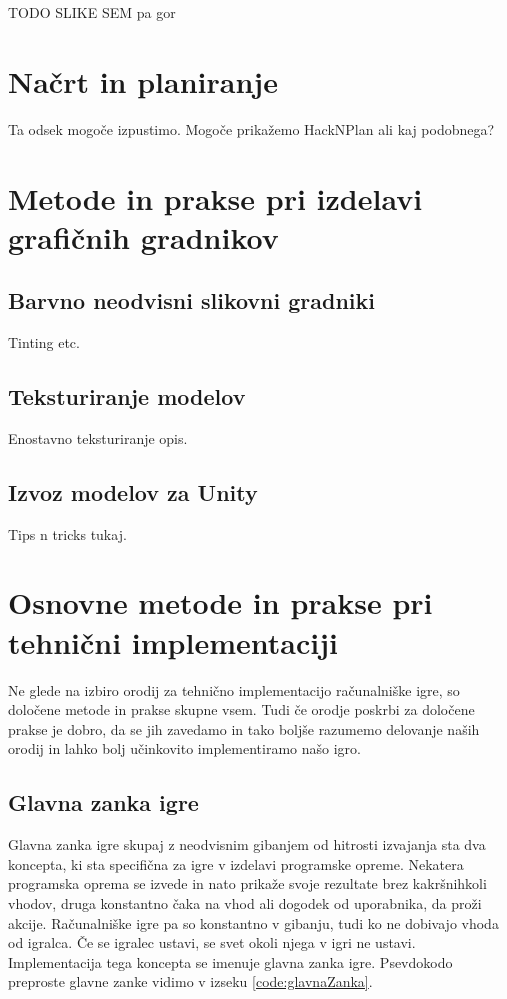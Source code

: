 \documentclass[12pt,a4paper,twoside]{book}
\begin{document}
TODO SLIKE SEM pa gor

\section{Načrt in planiranje}
Ta odsek mogoče izpustimo. Mogoče prikažemo HackNPlan ali kaj podobnega?
\section{Metode in prakse pri izdelavi grafičnih gradnikov}
\subsection{Barvno neodvisni slikovni gradniki}
Tinting etc.
\subsection{Teksturiranje modelov}
Enostavno teksturiranje opis.
\subsection{Izvoz modelov za Unity}
Tips n tricks tukaj.

\section{Osnovne metode in prakse pri tehnični implementaciji}
Ne glede na izbiro orodij za tehnično implementacijo računalniške igre, so določene metode in prakse skupne vsem. Tudi če orodje poskrbi za določene prakse je dobro, da se jih zavedamo in tako boljše razumemo delovanje naših orodij in lahko bolj učinkovito implementiramo našo igro.

\subsection{Glavna zanka igre}
Glavna zanka igre skupaj z neodvisnim gibanjem od hitrosti izvajanja sta dva koncepta, ki sta specifična za igre v izdelavi programske opreme. Nekatera programska oprema se izvede in nato prikaže svoje rezultate brez kakršnihkoli vhodov, druga konstantno čaka na vhod ali dogodek od uporabnika, da proži akcije. Računalniške igre pa so konstantno v gibanju, tudi ko ne dobivajo vhoda od igralca. Če se igralec ustavi, se svet okoli njega v igri ne ustavi. Implementacija tega koncepta se imenuje glavna zanka igre. Psevdokodo preproste glavne zanke vidimo v izseku \ref{code:glavnaZanka}.
\end{document}
